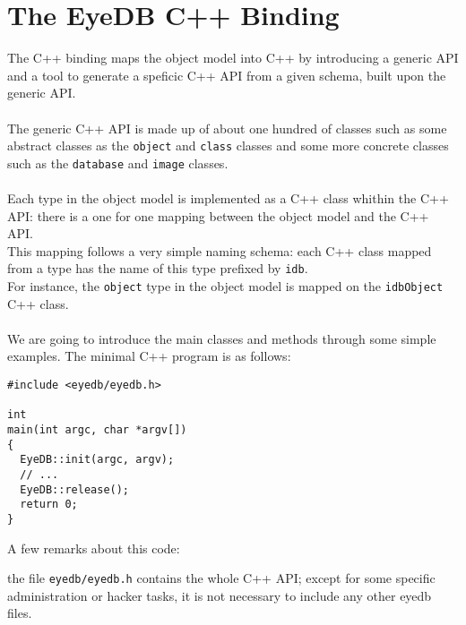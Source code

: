 

\newcommand{\mantitle}{\textsc{C++ Binding} }


\tableofcontents

\chapter{The EyeDB C++ Binding}

The C++ binding maps the \eyedb object model into C++ by introducing
a generic API
and a tool to generate a speficic C++ API from a given schema,
built upon the generic API.
\\
\\
The generic C++ API is made up of about one hundred of classes such
as some abstract classes as the \texttt{object} and \texttt{class} classes
and some more concrete classes such as the \texttt{database} and \texttt{image}
classes.
\\
\\
Each type in the \eyedb object model is implemented as a C++ class whithin
the C++ API: there is a one for one mapping between the object model and
the C++ API.
\\
This mapping follows a very simple naming schema: each C++ class mapped from
a type has the name of this type prefixed by \texttt{idb}.
\\
For instance, the \texttt{object} type in the \eyedb object model is
mapped on the \texttt{idbObject} C++ class.
\\
\\
We are going to introduce the main classes and methods through some simple
examples.
The minimal \eyedb C++ program is as follows:
\verbsize
\begin{verbatim}
#include <eyedb/eyedb.h>

int
main(int argc, char *argv[])
{
  EyeDB::init(argc, argv);
  // ...
  EyeDB::release();
  return 0;
}
\end{verbatim}
\normalsize
A few remarks about this code:
\be
\item the file \texttt{eyedb/eyedb.h} contains the whole \eyedb C++ API; except
for some specific administration or hacker tasks, it is not necessary
to include any other eyedb files.
